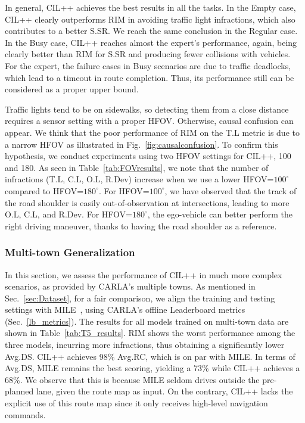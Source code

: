 In general, CIL++ achieves the best results in all the tasks. 
In the Empty case, CIL++ clearly outperforms RIM in avoiding traffic light infractions, which also contributes to a better S.SR. We reach the same conclusion in the Regular case. 
In the Busy case, CIL++ reaches almost the expert's performance, again, being clearly better than RIM for S.SR and producing fewer collisions with vehicles. 
For the expert, the failure cases in Busy scenarios are due to traffic deadlocks, which lead to a timeout in route completion. 
Thus, its performance still can be considered as a proper upper bound. 


Traffic lights tend to be on sidewalks, so detecting them from a close distance requires a sensor setting with a proper HFOV. 
Otherwise, causal confusion can appear. 
We think that the poor performance of RIM on the T.L metric is due to a narrow HFOV as illustrated in Fig.~\ref{fig:causalconfusion}.  
To confirm this hypothesis, we conduct experiments using two HFOV settings for CIL++, 100 and 180. 
As seen in Table~\ref{tab:FOVresults}, we note that the number of infractions (T.L, C.L, O.L, R.Dev) increase when we use a lower HFOV=$100^\circ$ compared to HFOV=$180^\circ$. 
For HFOV=$100^\circ$, we have observed that the track of the road shoulder is easily out-of-observation at intersections, leading to more O.L, C.L, and R.Dev. 
For HFOV=$180^{\circ}$, the ego-vehicle can better perform the right driving maneuver, thanks to having the road shoulder as a reference.


\subsubsection{Multi-town Generalization}\label{sec:multi_towns_result}
In this section, we assess the performance of CIL++ in much more complex scenarios, as provided by CARLA's multiple towns. 
As mentioned in Sec.~\ref{sec:Dataset}, for a fair comparison, we align the training and testing settings with MILE~\cite{Hu:2022}, using CARLA's offline Leaderboard metrics (Sec.~\ref{lb_metrics}).
The results for all models trained on multi-town data are shown in Table~\ref{tab:T5_results}. 
RIM shows the worst performance among the three models, incurring more infractions, thus obtaining a significantly lower Avg.DS. 
CIL++ achieves 98\% Avg.RC, which is on par with MILE. 
In terms of Avg.DS, MILE remains the best scoring, yielding a 73\% while CIL++ achieves a 68\%. 
We observe that this is because MILE seldom drives outside the pre-planned lane, given the route map as input. 
On the contrary, CIL++ lacks the explicit use of this route map since it only receives high-level navigation commands. 


